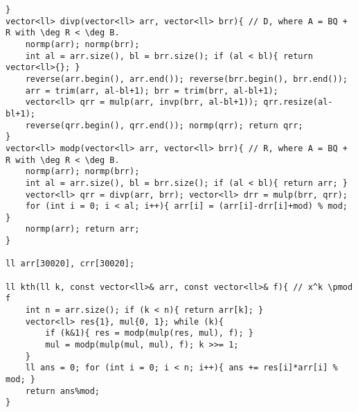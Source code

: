 \documentclass[landscape, 8pt, a4paper, oneside, twocolumn]{extarticle}
\begin{document}
\begin{verbatim}
}
vector<ll> divp(vector<ll> arr, vector<ll> brr){ // D, where A = BQ + R with \deg R < \deg B.
    normp(arr); normp(brr);
    int al = arr.size(), bl = brr.size(); if (al < bl){ return vector<ll>{}; }
    reverse(arr.begin(), arr.end()); reverse(brr.begin(), brr.end());
    arr = trim(arr, al-bl+1); brr = trim(brr, al-bl+1);
    vector<ll> qrr = mulp(arr, invp(brr, al-bl+1)); qrr.resize(al-bl+1);
    reverse(qrr.begin(), qrr.end()); normp(qrr); return qrr;
}
vector<ll> modp(vector<ll> arr, vector<ll> brr){ // R, where A = BQ + R with \deg R < \deg B.
    normp(arr); normp(brr);
    int al = arr.size(), bl = brr.size(); if (al < bl){ return arr; }
    vector<ll> qrr = divp(arr, brr); vector<ll> drr = mulp(brr, qrr);
    for (int i = 0; i < al; i++){ arr[i] = (arr[i]-drr[i]+mod) % mod; }
    normp(arr); return arr;
}

ll arr[30020], crr[30020];

ll kth(ll k, const vector<ll>& arr, const vector<ll>& f){ // x^k \pmod f
    int n = arr.size(); if (k < n){ return arr[k]; }
    vector<ll> res{1}, mul{0, 1}; while (k){
        if (k&1){ res = modp(mulp(res, mul), f); }
        mul = modp(mulp(mul, mul), f); k >>= 1;
    }
    ll ans = 0; for (int i = 0; i < n; i++){ ans += res[i]*arr[i] % mod; }
    return ans%mod;
}
\end{verbatim}
\end{document}
